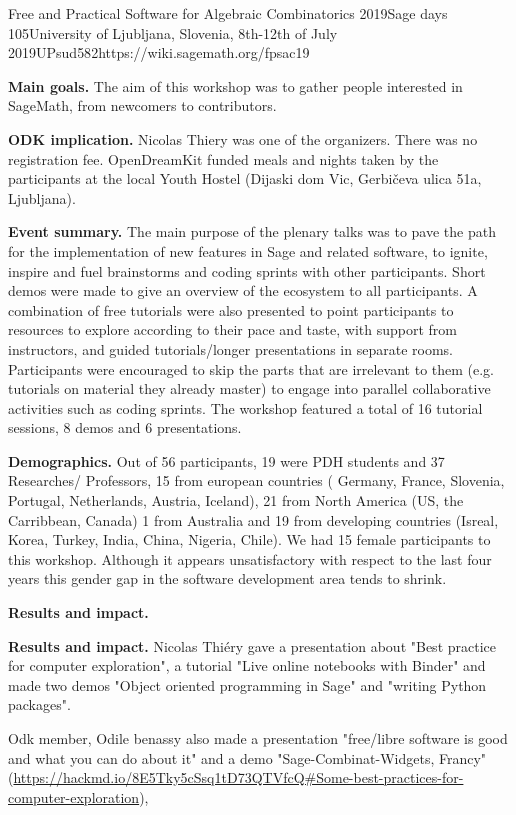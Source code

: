 \begin{event}{Free and Practical Software for Algebraic Combinatorics 2019}{Sage days 105}{University of Ljubljana, Slovenia,
8th-12th of July 2019}{UPsud}{58}{2}{https://wiki.sagemath.org/fpsac19}

\textbf{Main goals.} The aim of this workshop  was  to gather people  interested in SageMath, from newcomers to contributors.

\textbf{ODK implication.} Nicolas Thiery  was one of the organizers.
There was no registration fee. OpenDreamKit funded meals and nights taken by the participants 
at the local Youth Hostel (Dijaski dom Vic, Gerbičeva ulica 51a, Ljubljana). 

\textbf{Event summary.} The main purpose of the plenary talks was to pave the path for the implementation
of new features in Sage and related software, to ignite, inspire and fuel brainstorms and 
coding sprints with other participants. Short demos were made to give an overview of the
ecosystem to all participants. A combination of free tutorials were also presented to point participants to 
resources to explore according to their pace and taste, with support from instructors, and  guided tutorials/longer presentations
in separate rooms. Participants were encouraged to skip the parts that are 
irrelevant to them (e.g. tutorials on material they already master) to engage into parallel collaborative 
activities such as coding sprints. The workshop featured a total of 16 tutorial sessions, 8 demos and 6 presentations. 

\textbf{Demographics.} Out of 56 participants, 19 were PDH students and 37 Researches/ Professors, 15 from european countries 
( Germany, France, Slovenia, Portugal, Netherlands, Austria, Iceland), 21 from North America (US, the Carribbean, Canada) 
1 from Australia and 19 from developing countries (Isreal, Korea, Turkey, India, China, Nigeria, Chile).
 We had 15 female participants to this workshop. Although it appears unsatisfactory with respect to the last four years 
 this gender gap in the software development area tends to shrink. 

\textbf{Results and impact.}

\textbf{Results and impact.} Nicolas Thiéry gave a presentation about "Best practice 
for computer exploration", a tutorial "Live online notebooks with Binder" and made two demos 
"Object oriented programming in Sage" and "writing Python packages".

Odk member, Odile benassy also made a presentation "free/libre software is good and what you can do about it" and a 
demo "Sage-Combinat-Widgets, Francy"  (\url{https://hackmd.io/8E5Tky5cSsq1tD73QTVfcQ#Some-best-practices-for-computer-exploration}),
\end{event}
